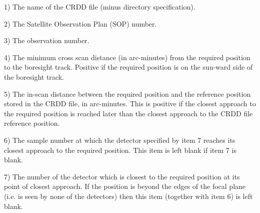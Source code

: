 \begin{small}
{{      1) The name of the CRDD file (minus directory specification).

      2) The Satellite Observation Plan (SOP) number.

      3) The observation number.

      4) The minimum cross scan distance (in arc-minutes) from the
      required position to the boresight track. Positive if the required
      position is on the sun-ward side of the boresight track.

      5) The in-scan distance between the required position and the
      reference position stored in the CRDD file, in arc-minutes. This
      is positive if the closest approach to the required position is
      reached later than the closest approach to the CRDD file
      reference position.

      6) The sample number at which the detector specified by item 7
      reaches its closest approach to the required position. This item
      is left blank if item 7 is blank.

      7) The number of the detector which is closest to the required
      position at its point of closest approach. If the position is
      beyond the edges of the focal plane (i.e. is seen by none of the
      detectors) then this item (together with item 6) is left blank.

}}
\end{small}

